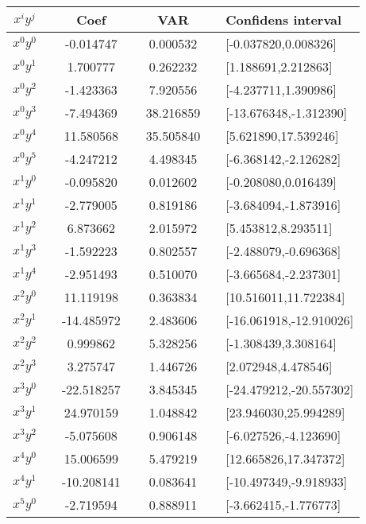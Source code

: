 \begin{center}
\label{tab:ridge-var-conf}
\begin{tabularx}{\textwidth}{c X c X c X l}
    \hline
    \hline
        $x^iy^j$ && Coef && VAR && Confidens interval\\
    \hline
        $x^0y^0$ && -0.014747  && 0.000532   && [-0.037820,0.008326] \\
        $x^0y^1$ && 1.700777   && 0.262232   && [1.188691,2.212863] \\
        $x^0y^2$ && -1.423363  && 7.920556   && [-4.237711,1.390986] \\
        $x^0y^3$ && -7.494369  && 38.216859  && [-13.676348,-1.312390] \\
        $x^0y^4$ && 11.580568  && 35.505840  && [5.621890,17.539246] \\
        $x^0y^5$ && -4.247212  && 4.498345   && [-6.368142,-2.126282] \\
        $x^1y^0$ && -0.095820  && 0.012602   && [-0.208080,0.016439] \\
        $x^1y^1$ && -2.779005  && 0.819186   && [-3.684094,-1.873916] \\
        $x^1y^2$ && 6.873662   && 2.015972   && [5.453812,8.293511] \\
        $x^1y^3$ && -1.592223  && 0.802557   && [-2.488079,-0.696368] \\
        $x^1y^4$ && -2.951493  && 0.510070   && [-3.665684,-2.237301] \\
        $x^2y^0$ && 11.119198  && 0.363834   && [10.516011,11.722384] \\
        $x^2y^1$ && -14.485972 && 2.483606   && [-16.061918,-12.910026] \\
        $x^2y^2$ && 0.999862   && 5.328256   && [-1.308439,3.308164] \\
        $x^2y^3$ && 3.275747   && 1.446726   && [2.072948,4.478546] \\
        $x^3y^0$ && -22.518257 && 3.845345   && [-24.479212,-20.557302] \\
        $x^3y^1$ && 24.970159  && 1.048842   && [23.946030,25.994289] \\
        $x^3y^2$ && -5.075608  && 0.906148   && [-6.027526,-4.123690] \\
        $x^4y^0$ && 15.006599  && 5.479219   && [12.665826,17.347372] \\
        $x^4y^1$ && -10.208141 && 0.083641   && [-10.497349,-9.918933] \\
        $x^5y^0$ && -2.719594  && 0.888911   && [-3.662415,-1.776773] \\
    \hline
\end{tabularx}
\end{center}
